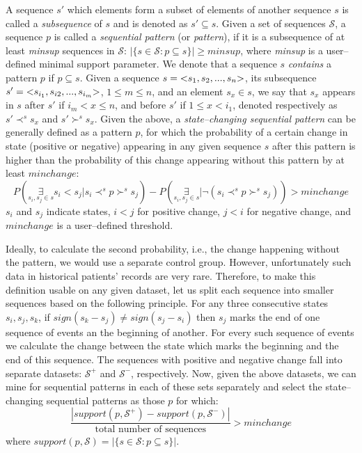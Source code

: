 \documentclass[runningheads,a4paper]{llncs}
\begin{document}
A sequence $s'$ which elements form a subset of elements of another sequence $s$ is called a \textit{subsequence} of $s$ and is denoted as $s'\subseteq s$.
Given a set of sequences $\mathcal{S}$, a sequence $p$ is called a \textit{sequential pattern} (or \textit{pattern}), if it is a subsequence of at least \textit{minsup} sequences in $\mathcal{S}$: $|\{s\in\mathcal{S}:p\subseteq s\}|\geq\textit{minsup}$, where \textit{minsup} is a user--defined minimal support parameter.
We denote that a sequence $s$ \textit{contains} a pattern $p$ if $p\subseteq s$.
Given a sequence $s=\text{\textless} s_1,s_2,...,s_n\text{\textgreater}$, its subsequence $s'=\text{\textless} s_{i_1}, s_{i2}, ..., s_{i_m}\text{\textgreater}$, $1\leq m\leq n$, and an element $s_x\in s$, we say that $s_x$ appears in $s$ after $s'$ if $i_m<x\leq n$, and before $s'$ if $1\leq x<i_1$, denoted respectively as $s'\prec^{s} s_x$ and $s'\succ^{s} s_x$.
Given the above, a \textit{state--changing sequential pattern} can be generally defined as a pattern $p$, for which the probability of a certain change in state (positive or negative) appearing in any given sequence $s$ after this pattern is higher than the probability of this change appearing without this pattern by at least $minchange$:
\begin{equation}
P(\underset{s_i,s_j \in s}{\exists} s_i<s_j|s_i \prec^{s} p \succ^{s} s_j) - P(\underset{s_i,s_j \in s}{\exists}|\neg(s_i \prec^{s} p \succ^{s} s_j)) > minchange
\label{eq:scsp}
\end{equation}
$s_i$ and $s_j$ indicate states, $i<j$ for positive change, $j<i$ for negative change, and $minchange$ is a user--defined threshold.

Ideally, to calculate the second probability, i.e., the change happening without the pattern, we would use a separate control group.
However, unfortunately such data in historical patients' records are very rare.
Therefore, to make this definition usable on any given dataset, let us split each sequence into smaller sequences based on the following principle.
For any three consecutive states $s_i, s_j, s_k$, if $sign(s_k-s_j)\neq sign(s_j-s_i)$ then $s_j$ marks the end of one sequence of events an the beginning of another.
For every such sequence of events we calculate the change between the state which marks the beginning and the end of this sequence.
The sequences with positive and negative change fall into separate datasets: $\mathcal{S}^+$ and $\mathcal{S}^-$, respectively.
Now, given the above datasets, we can mine for sequential patterns in each of these sets separately and select the state--changing sequential patterns as those $p$ for which:
$$\frac{|support(p,\mathcal{S}^+)-support(p,\mathcal{S}^-)|}{\text{total number of sequences}}> minchange$$
where $support(p,\mathcal{S})=|\{s\in \mathcal{S}:p\subseteq s\}|$.
\end{document}
